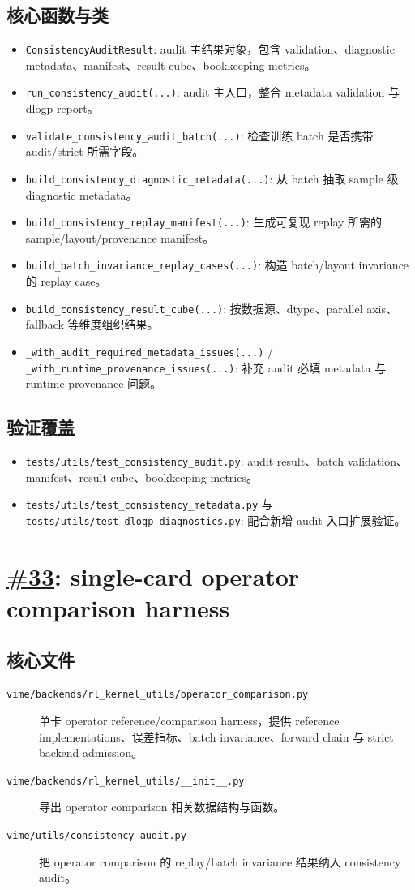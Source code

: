 \documentclass[11pt,a4paper]{ctexart}
\newcommand{\code}[1]{{\small\nolinkurl{#1}}}
\newcommand{\pr}[1]{\href{https://github.com/RL-Align/vime/pull/#1}{\##1}}
\newcommand{\fileitem}[2]{\item[\code{#1}] #2}
\begin{document}
\subsection{核心函数与类}
\begin{itemize}
  \item \code{ConsistencyAuditResult}: audit 主结果对象，包含 validation、diagnostic metadata、manifest、result cube、bookkeeping metrics。
  \item \code{run_consistency_audit(...)}: audit 主入口，整合 metadata validation 与 dlogp report。
  \item \code{validate_consistency_audit_batch(...)}: 检查训练 batch 是否携带 audit/strict 所需字段。
  \item \code{build_consistency_diagnostic_metadata(...)}: 从 batch 抽取 sample 级 diagnostic metadata。
  \item \code{build_consistency_replay_manifest(...)}: 生成可复现 replay 所需的 sample/layout/provenance manifest。
  \item \code{build_batch_invariance_replay_cases(...)}: 构造 batch/layout invariance 的 replay case。
  \item \code{build_consistency_result_cube(...)}: 按数据源、dtype、parallel axis、fallback 等维度组织结果。
  \item \code{_with_audit_required_metadata_issues(...)} / \code{_with_runtime_provenance_issues(...)}: 补充 audit 必填 metadata 与 runtime provenance 问题。
\end{itemize}

\subsection{验证覆盖}
\begin{itemize}
  \item \code{tests/utils/test_consistency_audit.py}: audit result、batch validation、manifest、result cube、bookkeeping metrics。
  \item \code{tests/utils/test_consistency_metadata.py} 与 \code{tests/utils/test_dlogp_diagnostics.py}: 配合新增 audit 入口扩展验证。
\end{itemize}

\newpage
\section{\pr{33}: single-card operator comparison harness}

\subsection{核心文件}
\begin{description}
  \fileitem{vime/backends/rl_kernel_utils/operator_comparison.py}{单卡 operator reference/comparison harness，提供 reference implementations、误差指标、batch invariance、forward chain 与 strict backend admission。}
  \fileitem{vime/backends/rl_kernel_utils/__init__.py}{导出 operator comparison 相关数据结构与函数。}
  \fileitem{vime/utils/consistency_audit.py}{把 operator comparison 的 replay/batch invariance 结果纳入 consistency audit。}
\end{description}
\end{document}
